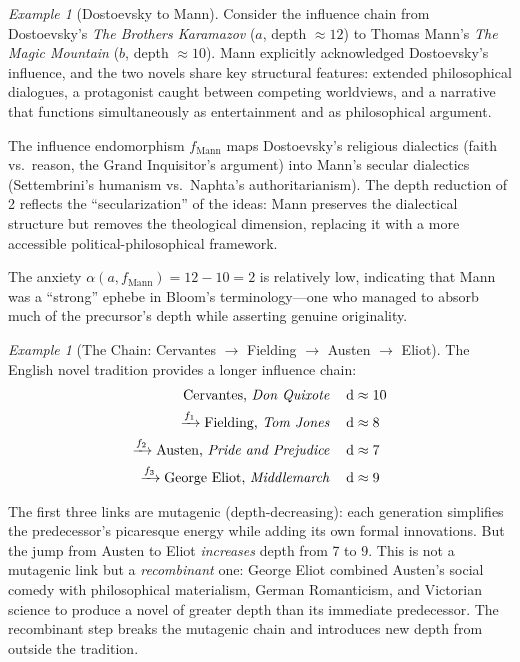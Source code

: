 \documentclass[11pt,openany]{book}
\theoremstyle{definition}
\theoremstyle{plain}
\theoremstyle{remark}
\newtheorem{example}[axiom]{Example}
\newcommand{\depth}{\operatorname{d}}       %
\begin{document}
\begin{example}[Dostoevsky to Mann]
Consider the influence chain from Dostoevsky's \emph{The Brothers Karamazov} ($a$, depth $\approx 12$) to Thomas Mann's \emph{The Magic Mountain} ($b$, depth $\approx 10$). Mann explicitly acknowledged Dostoevsky's influence, and the two novels share key structural features: extended philosophical dialogues, a protagonist caught between competing worldviews, and a narrative that functions simultaneously as entertainment and as philosophical argument.

The influence endomorphism $f_{\text{Mann}}$ maps Dostoevsky's religious dialectics (faith vs.\ reason, the Grand Inquisitor's argument) into Mann's secular dialectics (Settembrini's humanism vs.\ Naphta's authoritarianism). The depth reduction of 2 reflects the ``secularization'' of the ideas: Mann preserves the dialectical structure but removes the theological dimension, replacing it with a more accessible political-philosophical framework.

The anxiety $\alpha(a, f_{\text{Mann}}) = 12 - 10 = 2$ is relatively low, indicating that Mann was a ``strong'' ephebe in Bloom's terminology---one who managed to absorb much of the precursor's depth while asserting genuine originality.
\end{example}

\begin{example}[The Chain: Cervantes $\to$ Fielding $\to$ Austen $\to$ Eliot]
The English novel tradition provides a longer influence chain:
\begin{align*}
\text{Cervantes, \emph{Don Quixote}} &\quad \depth \approx 10 \\
\xrightarrow{f_1} \text{Fielding, \emph{Tom Jones}} &\quad \depth \approx 8 \\
\xrightarrow{f_2} \text{Austen, \emph{Pride and Prejudice}} &\quad \depth \approx 7 \\
\xrightarrow{f_3} \text{George Eliot, \emph{Middlemarch}} &\quad \depth \approx 9
\end{align*}

The first three links are mutagenic (depth-decreasing): each generation simplifies the predecessor's picaresque energy while adding its own formal innovations. But the jump from Austen to Eliot \emph{increases} depth from 7 to 9. This is not a mutagenic link but a \emph{recombinant} one: George Eliot combined Austen's social comedy with philosophical materialism, German Romanticism, and Victorian science to produce a novel of greater depth than its immediate predecessor. The recombinant step breaks the mutagenic chain and introduces new depth from outside the tradition.
\end{example}
\end{document}
